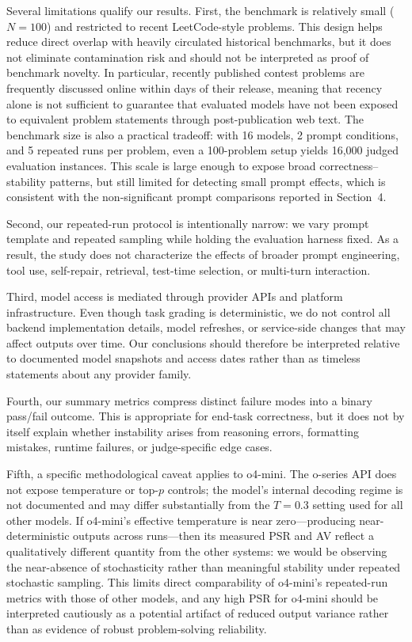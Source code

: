 \documentclass[11pt]{article}
\begin{document}
Several limitations qualify our results. First, the benchmark is relatively small ($N=100$) and restricted to recent LeetCode-style problems. This design helps reduce direct overlap with heavily circulated historical benchmarks, but it does not eliminate contamination risk and should not be interpreted as proof of benchmark novelty. In particular, recently published contest problems are frequently discussed online within days of their release, meaning that recency alone is not sufficient to guarantee that evaluated models have not been exposed to equivalent problem statements through post-publication web text. The benchmark size is also a practical tradeoff: with 16 models, 2 prompt conditions, and 5 repeated runs per problem, even a 100-problem setup yields 16{,}000 judged evaluation instances. This scale is large enough to expose broad correctness--stability patterns, but still limited for detecting small prompt effects, which is consistent with the non-significant prompt comparisons reported in Section~4.

Second, our repeated-run protocol is intentionally narrow: we vary prompt template and repeated sampling while holding the evaluation harness fixed. As a result, the study does not characterize the effects of broader prompt engineering, tool use, self-repair, retrieval, test-time selection, or multi-turn interaction.

Third, model access is mediated through provider APIs and platform infrastructure. Even though task grading is deterministic, we do not control all backend implementation details, model refreshes, or service-side changes that may affect outputs over time. Our conclusions should therefore be interpreted relative to documented model snapshots and access dates rather than as timeless statements about any provider family.

Fourth, our summary metrics compress distinct failure modes into a binary pass/fail outcome. This is appropriate for end-task correctness, but it does not by itself explain whether instability arises from reasoning errors, formatting mistakes, runtime failures, or judge-specific edge cases.

Fifth, a specific methodological caveat applies to o4-mini. The o-series API does not expose temperature or top-$p$ controls; the model's internal decoding regime is not documented and may differ substantially from the $T=0.3$ setting used for all other models. If o4-mini's effective temperature is near zero---producing near-deterministic outputs across runs---then its measured PSR and AV reflect a qualitatively different quantity from the other systems: we would be observing the near-absence of stochasticity rather than meaningful stability under repeated stochastic sampling. This limits direct comparability of o4-mini's repeated-run metrics with those of other models, and any high PSR for o4-mini should be interpreted cautiously as a potential artifact of reduced output variance rather than as evidence of robust problem-solving reliability.
\end{document}
